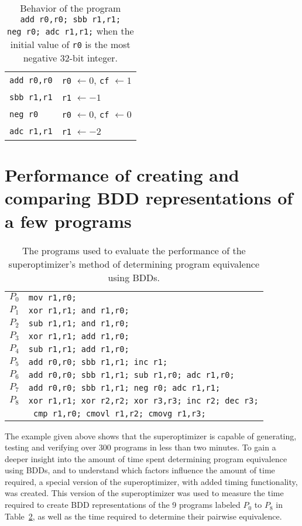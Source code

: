 \documentclass[a4paper,11pt]{kth-mag}
\renewcommand{\gets}{\leftarrow}
\begin{document}
\begin{table}
\centering
\tiny
\begin{tabular}{l|l}
\verb|add r0,r0|
& \verb|r0| $\gets 0$, \verb|cf| $\gets 1$ \\
\verb|sbb r1,r1|
& \verb|r1| $\gets -1$ \\
\verb|neg r0|
& \verb|r0| $\gets 0$, \verb|cf| $\gets 0$ \\
\verb|adc r1,r1|
& \verb|r1| $\gets -2$ \\
\end{tabular}
\caption{Behavior of the program \texttt{add~r0,r0; sbb~r1,r1; neg~r0; adc~r1,r1;} when the initial value of \texttt{r0} is the most negative 32-bit integer.}
\label{tab:sign_incorrect}
\end{table}

\section{Performance of creating and comparing BDD representations of a few programs}
\label{s:performance_programs}

\begin{table}
\centering
\tiny
\begin{tabular}{l|l}
$P_0$ & \verb|mov r1,r0;| \\
$P_1$ & \verb|xor r1,r1; and r1,r0;| \\
$P_2$ & \verb|sub r1,r1; and r1,r0;| \\
$P_3$ & \verb|xor r1,r1; add r1,r0;| \\
$P_4$ & \verb|sub r1,r1; add r1,r0;| \\
$P_5$ & \verb|add r0,r0; sbb r1,r1; inc r1;| \\
$P_6$ & \verb|add r0,r0; sbb r1,r1; sub r1,r0; adc r1,r0;| \\
$P_7$ & \verb|add r0,r0; sbb r1,r1; neg r0; adc r1,r1;| \\
$P_8$ & \verb|xor r1,r1; xor r2,r2; xor r3,r3; inc r2; dec r3;|\\
      & \verb| cmp r1,r0; cmovl r1,r2; cmovg r1,r3;| \\
\end{tabular}
\caption{The programs used to evaluate the performance of the superoptimizer's method of determining program equivalence using BDDs.}
\label{tab:test_programs}
\end{table}

The example given above shows that the superoptimizer is capable of generating, testing and verifying over 300 programs in less than two minutes.
To gain a deeper insight into the amount of time spent determining program equivalence using BDDs, and to understand which factors influence the amount of time required, a special version of the superoptimizer, with added timing functionality, was created.
This version of the superoptimizer was used to measure the time required to create BDD representations of the 9 programs labeled $P_0$ to $P_8$ in Table~\ref{tab:test_programs},
as well as the time required to determine their pairwise equivalence.
\end{document}
